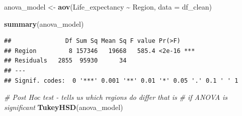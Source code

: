 \documentclass[
  10pt,
]{article}
\newenvironment{Shaded}{\begin{snugshade}}{\end{snugshade}}
\newcommand{\AttributeTok}[1]{\textcolor[rgb]{0.13,0.29,0.53}{#1}}
\newcommand{\CommentTok}[1]{\textcolor[rgb]{0.56,0.35,0.01}{\textit{#1}}}
\newcommand{\FunctionTok}[1]{\textcolor[rgb]{0.13,0.29,0.53}{\textbf{#1}}}
\newcommand{\NormalTok}[1]{#1}
\newcommand{\OtherTok}[1]{\textcolor[rgb]{0.56,0.35,0.01}{#1}}
\newcommand{\SpecialCharTok}[1]{\textcolor[rgb]{0.81,0.36,0.00}{\textbf{#1}}}
\begin{document}
\begin{Shaded}
\begin{Highlighting}[]
\NormalTok{anova\_model }\OtherTok{\textless{}{-}} \FunctionTok{aov}\NormalTok{(Life\_expectancy }\SpecialCharTok{\textasciitilde{}}\NormalTok{ Region, }\AttributeTok{data =}\NormalTok{ df\_clean)}

\FunctionTok{summary}\NormalTok{(anova\_model)}
\end{Highlighting}
\end{Shaded}

\begin{verbatim}
##               Df Sum Sq Mean Sq F value Pr(>F)    
## Region         8 157346   19668   585.4 <2e-16 ***
## Residuals   2855  95930      34                   
## ---
## Signif. codes:  0 '***' 0.001 '**' 0.01 '*' 0.05 '.' 0.1 ' ' 1
\end{verbatim}

\begin{Shaded}
\begin{Highlighting}[]
\CommentTok{\# Post Hoc test {-} tells us which regions do differ that is}
\CommentTok{\# if ANOVA is significant}
\FunctionTok{TukeyHSD}\NormalTok{(anova\_model)}
\end{Highlighting}
\end{Shaded}
\end{document}
